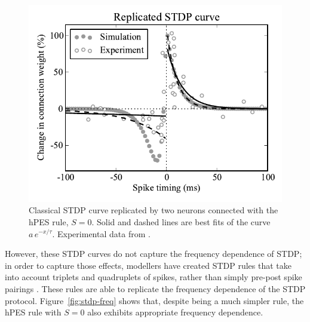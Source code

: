 \documentclass[10pt,letterpaper]{article}
\begin{document}
\begin{figure}[ht]
\begin{center}
\includegraphics[width=\columnwidth]{fig1-bcm-stdp}
\end{center}
\caption{Classical STDP curve replicated by two neurons
  connected with the hPES rule, $S = 0$.
  Solid and dashed lines are best fits of the curve
  $a\,e^{-x / \tau}$.
  Experimental data from \cite{Bi2001}.}
\label{fig:stdp-curve}
\end{figure}

However, these STDP curves do not capture
the frequency dependence of STDP;
in order to capture those effects,
modellers have created STDP rules that take into
account triplets and quadruplets of spikes,
rather than simply pre-post spike pairings \cite{Pfister2006}.
These rules are able to replicate
the frequency dependence of the STDP protocol.
Figure~\ref{fig:stdp-freq} shows that,
despite being a much simpler rule,
the hPES rule with $S = 0$
also exhibits appropriate frequency dependence.
\end{document}

